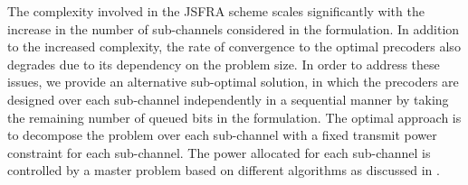 
The complexity involved in the \ac{JSFRA} scheme scales significantly with the increase in the number of sub-channels considered in the formulation. In addition to the increased complexity, the rate of convergence to the optimal precoders also degrades due to its dependency on the problem size. In order to address these issues, we provide an alternative sub-optimal solution, in which the precoders are designed over each sub-channel independently in a sequential manner by taking the remaining number of queued bits in the formulation. The optimal approach is to decompose the problem over each sub-channel with a fixed transmit power constraint for each sub-channel. The power allocated for each sub-channel is controlled by a master problem based on different algorithms as discussed in \cite{palomar2006tutorial,boyd2011distributed}.

